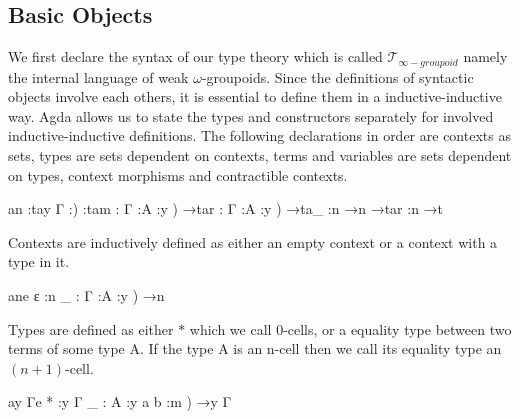 \documentclass{acm_proc_article-sp}
\newcommand{\wog}{weak $\omega$-groupoids}
\newcommand{\tig}{$\mathcal{T}_{\infty-groupoid}$}
\begin{document}
\subsection{Basic Objects}

We first declare the syntax of our type theory which is
called \tig{} namely the internal language of \wog. Since the definitions of syntactic objects involve each others, it is essential to define them in a inductive-inductive way. Agda allows us to state the types and constructors separately for involved inductive-inductive definitions. The following declarations in order are contexts as sets,
types are sets dependent on contexts, terms and variables are sets
dependent on types, context morphisms and contractible contexts.

\begin{code}%
\>an           :tay \AgdaBound{(}Γ :)  :tam            : \AgdaBound{\{}Γ :\AgdaBound{(}A :y ) →tar           : \AgdaBound{\{}Γ :\AgdaBound{(}A :y ) →ta\_           :n →n →tar       :n →t
\<%
\end{code}
Contexts are inductively defined as either an empty context or
a context with a type in it.

\begin{code}%
\>ane
  ε     :n
 \AgdaInductiveConstructor{ \_,}\_   : \AgdaBound{(}Γ :\AgdaBound{(}A :y ) →n
\<%
\end{code}
Types are defined as either $*$ which we
call 0-cells, or a equality type between two terms of some type A. If the
type A is an n-cell then we call its equality type an $(n+1)$-cell.

\begin{code}%
\>ay Γe
  *     :y Γ
 \_  : \AgdaBound{\{}A :y \AgdaBound{(}a b :m ) →y Γ
\<%
\end{code}
\end{document}
